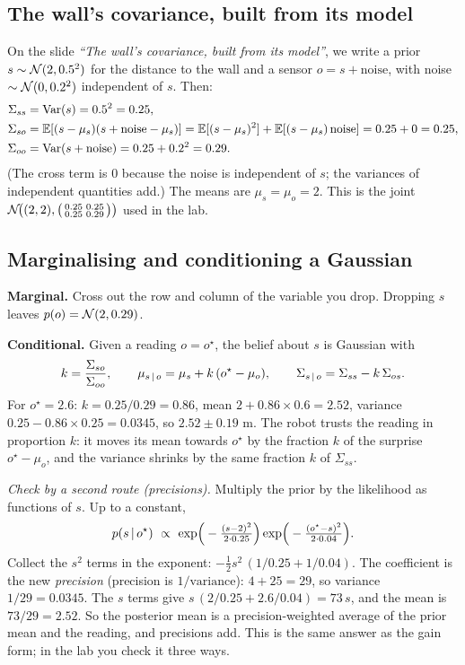 \documentclass[11pt]{article}
\newcommand{\slide}[1]{\textit{``#1''}}
\newcommand{\psm}[1]{\bigl(\begin{smallmatrix}#1\end{smallmatrix}\bigr)}
\begin{document}
\subsection*{The wall's covariance, built from its model}
On the slide \slide{The wall's covariance, built from its model}, we write a prior $s\sim\mathcal{N}(2,0.5^2)$ for the distance to the wall and a sensor $o=s+\text{noise}$, with noise $\sim\mathcal{N}(0,0.2^2)$ independent of $s$. Then:
\begin{align*}
\Sigma_{ss}&=\mathrm{Var}(s)=0.5^2=0.25,\\
\Sigma_{so}&=\mathbb{E}[(s-\mu_s)(s+\text{noise}-\mu_s)]=\mathbb{E}[(s-\mu_s)^2]+\mathbb{E}[(s-\mu_s)\,\text{noise}]=0.25+0=0.25,\\
\Sigma_{oo}&=\mathrm{Var}(s+\text{noise})=0.25+0.2^2=0.29 .
\end{align*}
(The cross term is 0 because the noise is independent of $s$; the variances of independent quantities add.) The means are $\mu_s=\mu_o=2$. This is the joint $\N\!\big((2,2),\psm{0.25&0.25\\0.25&0.29}\big)$ used in the lab.

\subsection*{Marginalising and conditioning a Gaussian}
\textbf{Marginal.} Cross out the row and column of the variable you drop. Dropping $s$ leaves $p(o)=\mathcal{N}(2,0.29)$.

\textbf{Conditional.} Given a reading $o=o^\star$, the belief about $s$ is Gaussian with
\[
k=\frac{\Sigma_{so}}{\Sigma_{oo}},\qquad
\mu_{s\,|\, o}=\mu_s+k\,(o^\star-\mu_o),\qquad
\Sigma_{s\,|\, o}=\Sigma_{ss}-k\,\Sigma_{os}.
\]
For $o^\star=2.6$: $k=0.25/0.29=0.86$, mean $2+0.86\times0.6=2.52$, variance $0.25-0.86\times0.25=0.0345$, so $2.52\pm0.19$ m.
The robot trusts the reading in proportion $k$: it moves its mean towards $o^\star$ by the fraction $k$ of the surprise $o^\star-\mu_o$, and the variance shrinks by the same fraction $k$ of $\Sigma_{ss}$.

\emph{Check by a second route (precisions).} Multiply the prior by the likelihood as functions of $s$. Up to a constant,
\[
p(s\given o^\star)\ \propto\ \exp\!\Big(-\tfrac{(s-2)^2}{2\cdot0.25}\Big)\exp\!\Big(-\tfrac{(o^\star-s)^2}{2\cdot0.04}\Big).
\]
Collect the $s^2$ terms in the exponent: $-\tfrac12 s^2\,(1/0.25+1/0.04)$. The coefficient is the new \emph{precision} (precision is $1/\text{variance}$): $4+25=29$, so variance $1/29=0.0345$. The $s$ terms give $s\,(2/0.25+2.6/0.04)=73\,s$, and the mean is $73/29=2.52$.
So the posterior mean is a precision-weighted average of the prior mean and the reading, and precisions add. This is the same answer as the gain form; in the lab you check it three ways.
\end{document}
